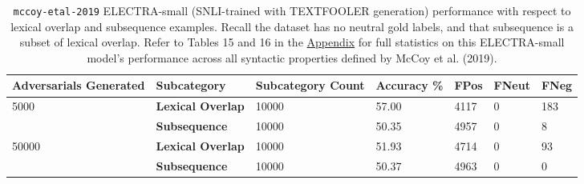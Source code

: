 \documentclass[11pt,a4paper]{article}
\begin{document}
\begin{table}[hbt!]
\begin{center}
\tiny
\begin{tabular}
{p{} p{}|p{} p{} p{} p{} p{} }
  \textbf{Adversarials Generated} & {\tiny \textbf{Subcategory}} & {\tiny \textbf{Subcategory} \textbf{Count}} & {\tiny \textbf{Accuracy} {\%}} & {\tiny \textbf{FPos}} & {\tiny \textbf{FNeut}} & {\tiny \textbf{FNeg}} \\
  \hline
  \multirow{2}{*}{5000} & {\tiny \textbf{Lexical Overlap}} & {\tiny 10000} & {\tiny 57.00} & {\tiny 4117} & {\tiny 0} & {\tiny 183} \\
  & {\tiny \textbf{Subsequence}} & {\tiny 10000} & {\tiny 50.35} & {\tiny 4957} & {\tiny 0} & {\tiny 8} \\
  
  \hline
  
  \multirow{2}{*}{50000} & {\tiny \textbf{Lexical Overlap}} & {\tiny 10000} & {\tiny 51.93} & {\tiny 4714} & {\tiny 0} & {\tiny 93} \\
  & {\tiny \textbf{Subsequence}} & {\tiny 10000} & {\tiny 50.37} & {\tiny 4963} & {\tiny 0} & {\tiny 0} \\
\end{tabular}
\end{center}
\caption{\texttt{mccoy-etal-2019} ELECTRA-small (SNLI-trained with TEXTFOOLER generation) performance with respect to lexical overlap and subsequence examples. Recall the dataset has no neutral gold labels, and that subsequence is a subset of lexical overlap. Refer to Tables 15 and 16 in the \hyperref[sec:appendix]{Appendix} for full statistics on this ELECTRA-small model's performance across all syntactic properties defined by McCoy et al. (2019).}
\end{table}
\end{document}

